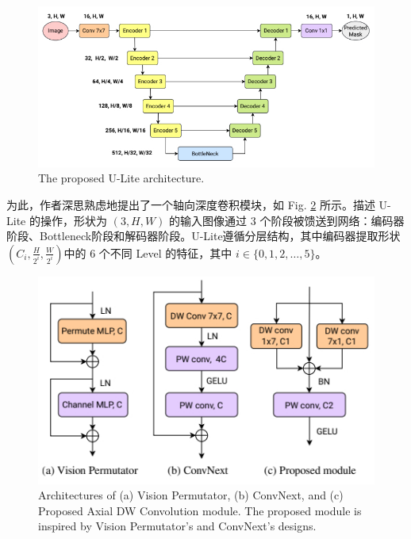 \documentclass[a4paper, 10pt]{article}
\begin{document}
			\begin{figure}[htbp]
				\centering 
				\includegraphics[width=\columnwidth]{picture/Lightweight Model/U-Lite Architecture}
				\caption{
					\label{fig: U-Lite Architecture} 
					The proposed U-Lite architecture.
				}
			\end{figure}
			
			为此，作者深思熟虑地提出了一个轴向深度卷积模块，如 Fig. \ref {fig: Axial Depthwise Convolution module} 所示。描述 U-Lite 的操作，形状为 $\left(3, H, W\right)$ 的输入图像通过 $3$ 个阶段被馈送到网络：编码器阶段、Bottleneck阶段和解码器阶段。U-Lite遵循分层结构，其中编码器提取形状$\left(C_i, \frac{H}{2^{i}}, \frac{W}{2^i}\right)$中的 $6$ 个不同 Level 的特征，其中 $i \in \{0,1,2, \ldots ,5\}$。
			
			\begin{figure}[htbp]
				\centering 
				\includegraphics[width=0.6\columnwidth]{picture/Lightweight Model/Axial Depthwise Convolution module}
				\caption{
					\label{fig: Axial Depthwise Convolution module} 
					Architectures of (a) Vision Permutator, (b) ConvNext, and (c) Proposed Axial DW Convolution module. The proposed module is inspired by Vision Permutator’s and ConvNext's designs.
				}
			\end{figure}
			
\end{document}
